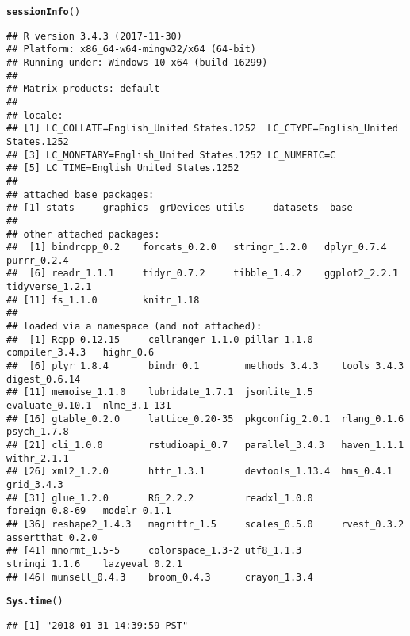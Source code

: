 \documentclass{article}\usepackage[]{graphicx}\usepackage[]{color}
\makeatletter
\newcommand{\hlstd}[1]{\textcolor[rgb]{0.345,0.345,0.345}{#1}}%
\newcommand{\hlkwd}[1]{\textcolor[rgb]{0.737,0.353,0.396}{\textbf{#1}}}%
\newenvironment{kframe}{%
 \def\at@end@of@kframe{}%
 \ifinner\ifhmode%
  \def\at@end@of@kframe{\end{minipage}}%
  \begin{minipage}{\columnwidth}%
 \fi\fi%
 \def\FrameCommand##1{\hskip\@totalleftmargin \hskip-\fboxsep
 \colorbox{shadecolor}{##1}\hskip-\fboxsep
     \hskip-\linewidth \hskip-\@totalleftmargin \hskip\columnwidth}%
 \MakeFramed {\advance\hsize-\width
   \@totalleftmargin\z@ \linewidth\hsize
   \@setminipage}}%
 {\par\unskip\endMakeFramed%
 \at@end@of@kframe}
\newenvironment{knitrout}{}{} %
\makeatother
\begin{document}
\begin{knitrout}
\color{fgcolor}\begin{kframe}
\begin{alltt}
\hlkwd{sessionInfo}\hlstd{()}
\end{alltt}
\begin{verbatim}
## R version 3.4.3 (2017-11-30)
## Platform: x86_64-w64-mingw32/x64 (64-bit)
## Running under: Windows 10 x64 (build 16299)
## 
## Matrix products: default
## 
## locale:
## [1] LC_COLLATE=English_United States.1252  LC_CTYPE=English_United States.1252   
## [3] LC_MONETARY=English_United States.1252 LC_NUMERIC=C                          
## [5] LC_TIME=English_United States.1252    
## 
## attached base packages:
## [1] stats     graphics  grDevices utils     datasets  base     
## 
## other attached packages:
##  [1] bindrcpp_0.2    forcats_0.2.0   stringr_1.2.0   dplyr_0.7.4     purrr_0.2.4    
##  [6] readr_1.1.1     tidyr_0.7.2     tibble_1.4.2    ggplot2_2.2.1   tidyverse_1.2.1
## [11] fs_1.1.0        knitr_1.18     
## 
## loaded via a namespace (and not attached):
##  [1] Rcpp_0.12.15     cellranger_1.1.0 pillar_1.1.0     compiler_3.4.3   highr_0.6       
##  [6] plyr_1.8.4       bindr_0.1        methods_3.4.3    tools_3.4.3      digest_0.6.14   
## [11] memoise_1.1.0    lubridate_1.7.1  jsonlite_1.5     evaluate_0.10.1  nlme_3.1-131    
## [16] gtable_0.2.0     lattice_0.20-35  pkgconfig_2.0.1  rlang_0.1.6      psych_1.7.8     
## [21] cli_1.0.0        rstudioapi_0.7   parallel_3.4.3   haven_1.1.1      withr_2.1.1     
## [26] xml2_1.2.0       httr_1.3.1       devtools_1.13.4  hms_0.4.1        grid_3.4.3      
## [31] glue_1.2.0       R6_2.2.2         readxl_1.0.0     foreign_0.8-69   modelr_0.1.1    
## [36] reshape2_1.4.3   magrittr_1.5     scales_0.5.0     rvest_0.3.2      assertthat_0.2.0
## [41] mnormt_1.5-5     colorspace_1.3-2 utf8_1.1.3       stringi_1.1.6    lazyeval_0.2.1  
## [46] munsell_0.4.3    broom_0.4.3      crayon_1.3.4
\end{verbatim}
\begin{alltt}
\hlkwd{Sys.time}\hlstd{()}
\end{alltt}
\begin{verbatim}
## [1] "2018-01-31 14:39:59 PST"
\end{verbatim}
\end{kframe}
\end{knitrout}
\end{document}

